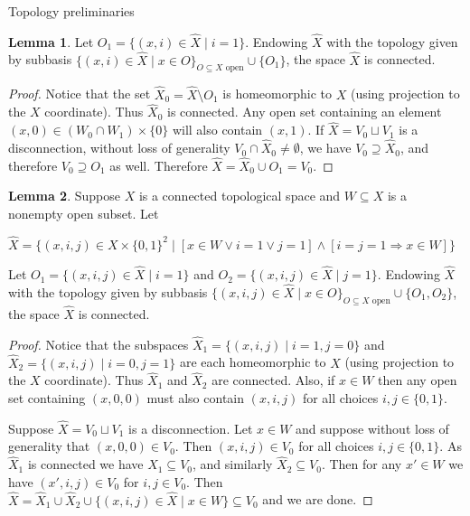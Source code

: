 \documentclass{amsart}
\theoremstyle{definition}\newtheorem{theorem}{Theorem}
\theoremstyle{definition}\newtheorem{bigtheorem}{Theorem}
\numberwithin{theorem}{section}
\theoremstyle{definition}\newtheorem{corollary}[theorem]{Corollary}
\theoremstyle{definition}\newtheorem{proposition}[theorem]{Proposition}
\theoremstyle{definition}\newtheorem{definition}[theorem]{Definition}
\theoremstyle{definition}\newtheorem{question}[theorem]{Question}
\theoremstyle{definition}\newtheorem{example}[theorem]{Example}
\theoremstyle{definition}\newtheorem{remark}[theorem]{Remark}
\theoremstyle{definition}\newtheorem{note}[theorem]{Note}
\theoremstyle{definition}\newtheorem{lemma}[theorem]{Lemma}
\theoremstyle{definition}\newtheorem{fact}[theorem]{Fact}
\theoremstyle{definition}\newtheorem{define}[theorem]{Definition}
\theoremstyle{definition}\newtheorem{definitions}[theorem]{Definitions}
\theoremstyle{definition}\newtheorem{claim}[theorem]{Claim}
\theoremstyle{definition}\newtheorem{obs}[theorem]{Observation}
\theoremstyle{definition}\newtheorem{construction}[theorem]{Construction}
\begin{document}
\begin{section}{Topology preliminaries}
\begin{lemma}
\noindent  Let $O_1 = \{(x, i)\in \hat{X} \mid i = 1\}$.  Endowing $\hat{X}$ with the topology given by subbasis $\{(x, i)\in \hat{X}\mid x\in O\}_{O \subseteq X \text{ open}} \cup \{O_1\}$, the space $\hat{X}$ is connected.
\end{lemma}

\begin{proof}  Notice that the set $\hat{X}_0 = \hat{X} \setminus O_1$ is homeomorphic to $X$ (using projection to the $X$ coordinate).  Thus $\hat{X}_0$ is connected.  Any open set containing an element $(x, 0) \in (W_0 \cap W_1)\times \{0\}$ will also contain $(x, 1)$.  If $\hat{X} = V_0 \sqcup V_1$ is a disconnection, without loss of generality $V_0 \cap \hat{X}_0 \neq \emptyset$, we have $V_0 \supseteq \hat{X}_0$, and therefore $V_0 \supseteq O_1$ as well.  Therefore $\hat{X} = \hat{X}_0 \cup O_1 = V_0$.
\end{proof}


\begin{lemma}\label{splittinginhalf}  Suppose $X$ is a connected topological space and $W \subseteq X$ is a nonempty open subset.  Let

\begin{center}

$\hat{X} = \{(x, i, j)\in X \times \{0, 1\}^2 \mid [x\in W \vee i = 1 \vee j = 1]\wedge[i = j = 1 \Rightarrow x\in W]\}$

\end{center}

\noindent Let $O_1 = \{(x, i, j)\in \hat{X} \mid i = 1\}$ and $O_2 = \{(x, i, j)\in \hat{X} \mid j = 1\}$.  Endowing $\hat{X}$ with the topology given by subbasis $\{(x, i, j)\in \hat{X} \mid x\in O\}_{O \subseteq X \text{ open}} \cup \{O_1, O_2\}$, the space $\hat{X}$ is connected.
\end{lemma}

\begin{proof}  Notice that the subspaces $\hat{X}_1 = \{(x, i, j) \mid i = 1, j = 0\}$ and $\hat{X}_2 = \{(x, i, j)\mid i = 0, j = 1\}$ are each homeomorphic to $X$ (using projection to the $X$ coordinate).  Thus $\hat{X}_1$ and $\hat{X}_2$ are connected.  Also, if $x\in W$ then any open set containing $(x, 0, 0)$ must also contain $(x, i, j)$ for all choices $i, j\in \{0, 1\}$.

Suppose $\hat{X} = V_0 \sqcup V_1$ is a disconnection.  Let $x\in W$ and suppose without loss of generality that $(x, 0, 0) \in V_0$.  Then $(x, i, j)\in V_0$ for all choices $i, j\in \{0, 1\}$.  As $\hat{X}_1$ is connected we have $\hat{X}_1 \subseteq V_0$, and similarly $\hat{X}_2 \subseteq V_0$.  Then for any $x' \in W$ we have $(x', i, j) \in V_0$ for $i, j \in V_0$.  Then $\hat{X} = \hat{X}_1 \cup \hat{X}_2 \cup \{(x, i, j) \in \hat{X}\mid x\in W\} \subseteq V_0$ and we are done.
\end{proof}



\end{section}
\end{document}
